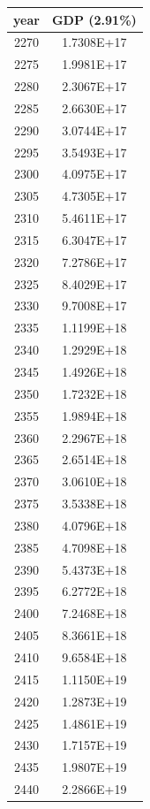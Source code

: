 \documentclass[a4paper]{article}
\begin{document}
	\begin{tabular}{|c|c|}
		\hline
		year & GDP (2.91\%) \\
		\hline
		2270 & 1.7308E+17 \\
		\hline
		2275 & 1.9981E+17 \\
		\hline
		2280 & 2.3067E+17 \\
		\hline
		2285 & 2.6630E+17 \\
		\hline
		2290 & 3.0744E+17 \\
		\hline
		2295 & 3.5493E+17 \\
		\hline
		2300 & 4.0975E+17 \\
		\hline
		2305 & 4.7305E+17 \\
		\hline
		2310 & 5.4611E+17 \\
		\hline
		2315 & 6.3047E+17 \\
		\hline
		2320 & 7.2786E+17 \\
		\hline
		2325 & 8.4029E+17 \\
		\hline
		2330 & 9.7008E+17 \\
		\hline
		2335 & 1.1199E+18 \\
		\hline
		2340 & 1.2929E+18 \\
		\hline
		2345 & 1.4926E+18 \\
		\hline
		2350 & 1.7232E+18 \\
		\hline
		2355 & 1.9894E+18 \\
		\hline
		2360 & 2.2967E+18 \\
		\hline
		2365 & 2.6514E+18 \\
		\hline
		2370 & 3.0610E+18 \\
		\hline
		2375 & 3.5338E+18 \\
		\hline
		2380 & 4.0796E+18 \\
		\hline
		2385 & 4.7098E+18 \\
		\hline
		2390 & 5.4373E+18 \\
		\hline
		2395 & 6.2772E+18 \\
		\hline
		2400 & 7.2468E+18 \\
		\hline
		2405 & 8.3661E+18 \\
		\hline
		2410 & 9.6584E+18 \\
		\hline
		2415 & 1.1150E+19 \\
		\hline
		2420 & 1.2873E+19 \\
		\hline
		2425 & 1.4861E+19 \\
		\hline
		2430 & 1.7157E+19 \\
		\hline
		2435 & 1.9807E+19 \\
		\hline
		2440 & 2.2866E+19 \\

\end{tabular}
\end{document}
